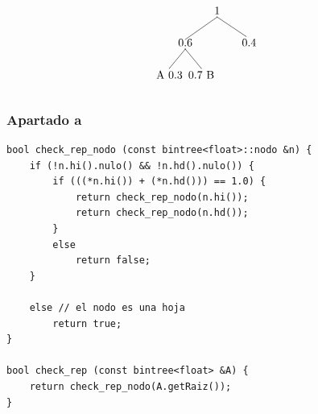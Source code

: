 \documentclass[10pt,a4paper,spanish]{report}
\begin{document}
      \begin{minipage}{0.5\textwidth}
      \[\begin{xy}
      ,(0,0)*+=<10mm>[]\txt<2cm>{1}
      ,(-10,-10)*+=<10mm>[]\txt<2cm>{0.6}
      ,(10,-10)*+=<10mm>[]\txt<2cm>{0.4}
      ,(-15,-20)*+=<10mm>[]\txt<2cm>{A 0.3}
      ,(-5,-20)*+=<10mm>[]\txt<2cm>{0.7 B}

      \ar@{-} (0,-2);(-10,-9) %
      \ar@{-} (0,-2);(9,-8) %
      \ar@{-} (-10,-12);(-15,-18) %
      \ar@{-} (-10,-12);(-5,-18)
      \end{xy}\]
      \end{minipage}

\subsubsection{\textcolor[rgb]{0.5,0.8,1}Apartado a}

\begin{verbatim}
bool check_rep_nodo (const bintree<float>::nodo &n) {
    if (!n.hi().nulo() && !n.hd().nulo()) {
        if (((*n.hi()) + (*n.hd())) == 1.0) {
            return check_rep_nodo(n.hi());
            return check_rep_nodo(n.hd());
        }
        else
            return false;
    }

    else // el nodo es una hoja
        return true;
}

bool check_rep (const bintree<float> &A) {
    return check_rep_nodo(A.getRaiz());
}
\end{verbatim}
\end{document}
